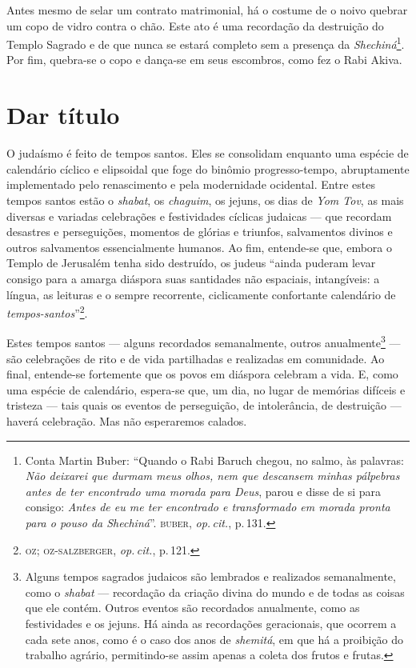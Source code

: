 Antes mesmo de selar um contrato matrimonial, há o costume de o
noivo quebrar um copo de vidro contra o chão. Este ato é uma recordação
da destruição do Templo Sagrado e de que nunca se estará completo sem a
presença da \emph{Shechiná}\footnote{Conta Martin Buber: ``Quando
  o Rabi Baruch chegou, no salmo, às palavras: \emph{Não deixarei que durmam
  meus olhos, nem que descansem minhas pálpebras antes de ter encontrado
  uma morada para Deus}, parou e disse de si para consigo: \emph{Antes de eu
  me ter encontrado e transformado em morada pronta para o pouso da
  Shechiná}''. \textsc{buber}, \emph{op.\,cit.}, p.\,131.}. Por fim, quebra-se o copo e dança-se
em seus escombros, como fez o Rabi Akiva.

\section{Dar título}

O judaísmo é feito de tempos santos. Eles se consolidam enquanto uma
espécie de calendário cíclico e elipsoidal que foge do binômio
progresso-tempo, abruptamente implementado pelo renascimento e pela
modernidade ocidental. Entre estes tempos santos estão o \emph{shabat},
os \emph{chaguim}, os jejuns, os dias de \emph{Yom Tov}, as mais
diversas e variadas celebrações e festividades cíclicas judaicas --- que
recordam desastres e perseguições, momentos de glórias e triunfos,
salvamentos divinos e outros salvamentos essencialmente humanos. Ao fim,
entende-se que, embora o Templo de Jerusalém tenha sido destruído, os
judeus ``ainda puderam levar consigo para a amarga diáspora suas
santidades não espaciais, intangíveis: a língua, as leituras e o sempre
recorrente, ciclicamente confortante calendário de
\emph{tempos-santos}''\footnote{\textsc{oz; oz-salzberger}, \emph{op.\,cit.}, p.\,121.}.

Estes tempos santos --- alguns recordados semanalmente, outros
anualmente\footnote{Alguns tempos sagrados judaicos são lembrados e
  realizados semanalmente, como o \emph{shabat} --- recordação da
  criação divina do mundo e de todas as coisas que ele contém. Outros
  eventos são recordados anualmente, como as festividades e os jejuns.
  Há ainda as recordações geracionais, que ocorrem a cada sete anos,
  como é o caso dos anos de \emph{shemitá}, em que há a proibição do
  trabalho agrário, permitindo-se assim apenas a coleta dos frutos e
  frutas.} --- são celebrações de rito e de vida partilhadas e
realizadas em comunidade. Ao final, entende-se fortemente que os povos
em diáspora celebram a vida. E, como uma espécie de calendário,
espera-se que, um dia, no lugar de memórias difíceis e tristeza --- tais
quais os eventos de perseguição, de intolerância, de destruição ---
haverá celebração. Mas não esperaremos calados.

